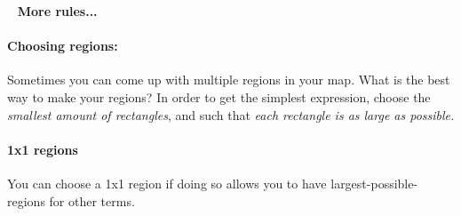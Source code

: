 \documentclass[a4paper,12pt]{book}
\begin{document}
        \begin{intro}{\ }
            \textbf{More rules...}

            \paragraph{Choosing regions:}
            Sometimes you can come up with multiple regions in your map.
            What is the best way to make your regions? In order to get
            the simplest expression, choose the \textit{smallest amount of rectangles},
            and such that \textit{each rectangle is as large as possible.}

            \paragraph{1x1 regions} You can choose a 1x1 region if
            doing so allows you to have largest-possible-regions for other terms.

        \end{intro}
\end{document}
